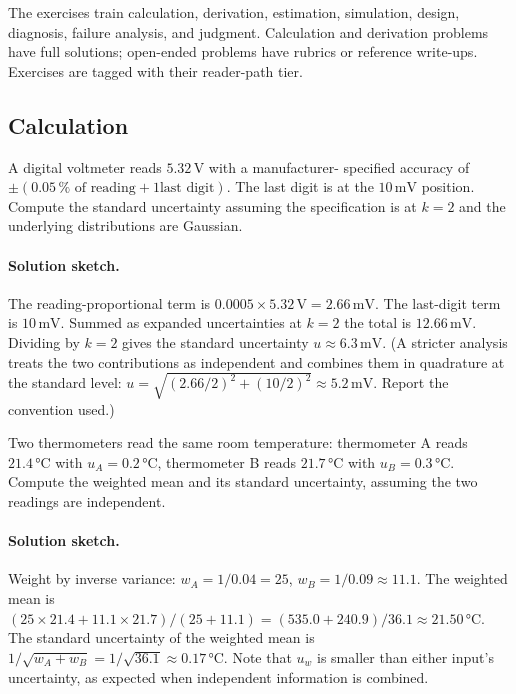 The exercises train calculation, derivation, estimation, simulation,
design, diagnosis, failure analysis, and judgment. Calculation and
derivation problems have full solutions; open-ended problems have
rubrics or reference write-ups. Exercises are tagged with their
reader-path tier.

\subsection*{Calculation}

\begin{exercise}
A digital voltmeter reads $5.32 \,\si{\volt}$ with a manufacturer-
specified accuracy of $\pm (0.05\,\% \text{ of reading} + 1 \text{
last digit})$. The last digit is at the $10 \,\si{\milli\volt}$
position. Compute the standard uncertainty assuming the
specification is at $k = 2$ and the underlying distributions are
Gaussian.
\end{exercise}

\paragraph{Solution sketch.}
The reading-proportional term is $0.0005 \times 5.32 \,\si{\volt} =
2.66 \,\si{\milli\volt}$. The last-digit term is
$10 \,\si{\milli\volt}$. Summed as expanded uncertainties at $k = 2$
the total is $12.66 \,\si{\milli\volt}$. Dividing by $k = 2$ gives
the standard uncertainty $u \approx 6.3 \,\si{\milli\volt}$. (A
stricter analysis treats the two contributions as independent and
combines them in quadrature at the standard level: $u =
\sqrt{(2.66/2)^{2} + (10/2)^{2}} \approx 5.2 \,\si{\milli\volt}$.
Report the convention used.)

\begin{exercise}
Two thermometers read the same room temperature: thermometer A
reads $21.4 \,\si{\degreeCelsius}$ with $u_{A} = 0.2 \,\si{\degreeCelsius}$,
thermometer B reads $21.7 \,\si{\degreeCelsius}$ with $u_{B} = 0.3
\,\si{\degreeCelsius}$. Compute the weighted mean and its standard
uncertainty, assuming the two readings are independent.
\end{exercise}

\paragraph{Solution sketch.}
Weight by inverse variance: $w_{A} = 1/0.04 = 25$,
$w_{B} = 1/0.09 \approx 11.1$. The weighted mean is
$(25 \times 21.4 + 11.1 \times 21.7)/(25 + 11.1) = (535.0 + 240.9)/
36.1 \approx 21.50 \,\si{\degreeCelsius}$. The standard uncertainty
of the weighted mean is $1/\sqrt{w_{A} + w_{B}} = 1/\sqrt{36.1}
\approx 0.17 \,\si{\degreeCelsius}$. Note that $u_{w}$ is smaller
than either input's uncertainty, as expected when independent
information is combined.

